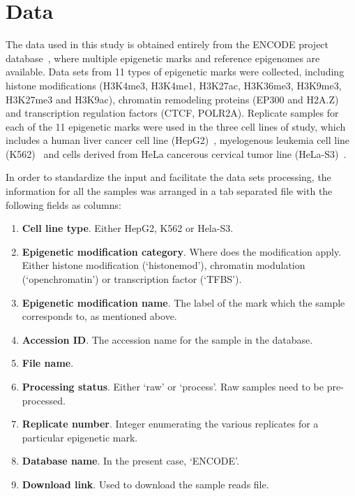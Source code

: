 \section{Data}

The data used in this study is obtained entirely from the ENCODE project database~\cite{Feingold2004}, where multiple epigenetic marks and reference epigenomes are available. Data sets from 11 types of epigenetic marks were collected, including histone modifications (H3K4me3, H3K4me1, H3K27ac, H3K36me3, H3K9me3, H3K27me3 and H3K9ac), chromatin remodeling proteins (EP300 and H2A.Z) and transcription regulation factors (CTCF, POLR2A). Replicate samples for each of the 11 epigenetic marks were used in the three cell lines of study, which includes a human liver cancer cell line (HepG2)~\cite{Aden1979}, myelogenous leukemia cell line (K562)~\cite{Andersson1979} and cells derived from HeLa cancerous cervical tumor line (HeLa-S3)~\cite{Douglas1973,Chen2008}.

\medskip

In order to standardize the input and facilitate the data sets processing, the information for all the samples was arranged in a tab separated file with the following fields as columns:

\begin{enumerate}
    \item \textbf{Cell line type}. Either HepG2, K562 or Hela-S3.
    \item \textbf{Epigenetic modification category}. Where does the modification apply. Either histone modification (`histonemod'), chromatin modulation (`openchromatin') or transcription factor (`TFBS').
    \item \textbf{Epigenetic modification name}. The label of the mark which the sample corresponds to, as mentioned above.
    \item \textbf{Accession ID}. The accession name for the sample in the database.
    \item \textbf{File name}.
    \item \textbf{Processing status}. Either `raw' or `process'. Raw samples need to be pre-processed.
    \item \textbf{Replicate number}. Integer enumerating the various replicates for a particular epigenetic mark.
    \item \textbf{Database name}. In the present case, `ENCODE'.
    \item \textbf{Download link}. Used to download the sample reads file.
\end{enumerate}

